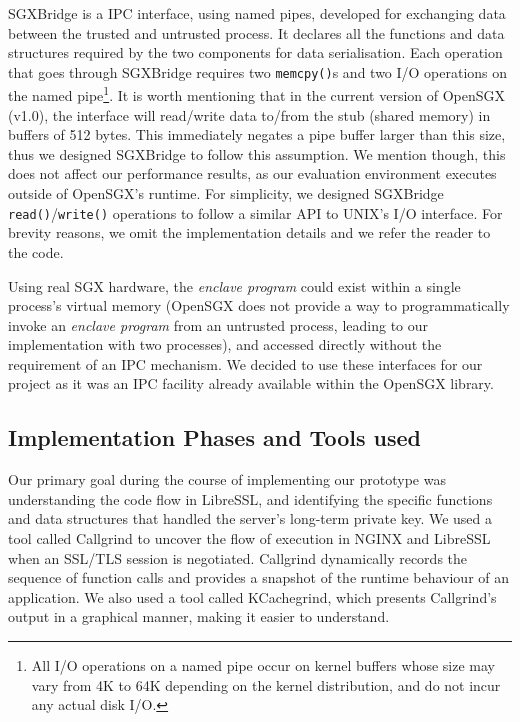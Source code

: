 \documentclass[../main.tex]{subfiles}
\begin{document}
SGXBridge is a IPC interface, using named pipes, developed for
exchanging data between the trusted and untrusted process. It declares
all the functions and data structures required by the two components
for data serialisation. Each operation that goes through SGXBridge
requires two \texttt{memcpy()}s and two I/O operations on the named
pipe\footnote{All I/O operations on a named pipe occur on kernel
  buffers whose size may vary from 4K to 64K depending on the kernel
  distribution, and do not incur any actual disk I/O.}. It is worth
mentioning that in the current version of OpenSGX (v1.0), the
interface will read/write data to/from the stub (shared memory) in
buffers of 512 bytes. This immediately negates a pipe buffer larger
than this size, thus we designed SGXBridge to follow this assumption.
We mention though, this does not affect our performance results, as
our evaluation environment executes outside of OpenSGX's runtime. For
simplicity, we designed SGXBridge \texttt{read()}/\texttt{write()}
operations to follow a similar API to UNIX's I/O interface. For
brevity reasons, we omit the implementation details and we refer the
reader to the code.

Using real SGX hardware, the \textit{enclave program} could exist
within a single process's virtual memory (OpenSGX does not provide a
way to programmatically invoke an \textit{enclave program} from an
untrusted process, leading to our implementation with two processes),
and accessed directly without the requirement of an IPC mechanism. We
decided to use these interfaces for our project as it was an IPC
facility already available within the OpenSGX library.

\subsection{Implementation Phases and Tools used}
Our primary goal during the course of implementing our prototype was
understanding the code flow in LibreSSL, and identifying the specific
functions and data structures that handled the server's long-term
private key. We used a tool called Callgrind to uncover the flow of
execution in NGINX and LibreSSL when an SSL/TLS session is negotiated.
Callgrind dynamically records the sequence of function calls and
provides a snapshot of the runtime behaviour of an application. We
also used a tool called KCachegrind, which presents Callgrind's output
in a graphical manner, making it easier to understand.
 
\end{document}
